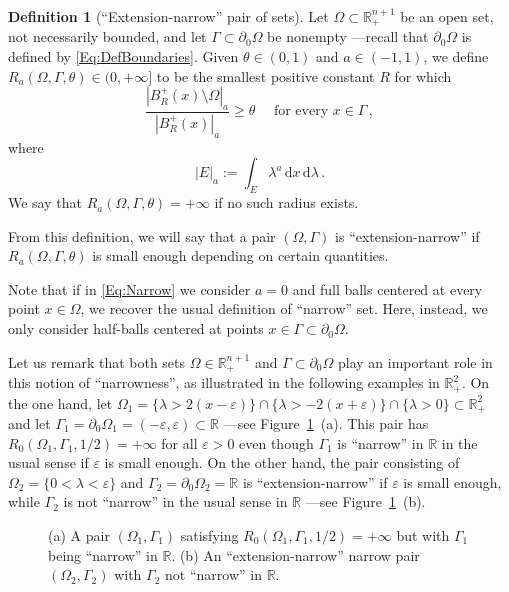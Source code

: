 \documentclass[twoside,leqno,symbols-for-thanks, draft]{rmi}
\numberwithin{equation}{section}
\theoremstyle{definition}
\newtheorem{definition}[theorem]{Definition}
\newcommand{\con}[1]{\mathbb{#1}}
\newcommand{\R}{\con{R}} %
\renewcommand{\d}{\,\mathrm{d}} %
\newcommand{\dx}{\,\mathrm{d}x} %
\begin{document}
\begin{definition}[``Extension-narrow'' pair of sets]
	Let $\Omega \subset \R^{n+1}_+$ be an open set, not necessarily bounded, and let $\Gamma \subset \partial_0 \Omega$ be nonempty ---recall that $\partial_0 \Omega$ is defined by \eqref{Eq:DefBoundaries}. Given $\theta \in (0,1)$ and $a\in (-1,1)$, we define $R_a(\Omega,\Gamma,\theta) \in (0, +\infty]$ to be the smallest positive constant $R$ for which
	\begin{equation}
	\label{Eq:Narrow}
	\dfrac{|B^+_R(x)\setminus \Omega|_a}{|B^+_R(x)|_a} \geq \theta \quad \text{ for every } x \in \Gamma\,,
	\end{equation}
	where 
	$$
	|E|_a := \int_E \lambda^a \dx \d \lambda\,.
	$$
	We say that $R_a(\Omega,\Gamma,\theta) = + \infty$ if no such radius exists.
	
	From this definition, we will say that a pair $(\Omega, \Gamma)$ is ``extension-narrow'' if $R_a(\Omega,\Gamma,\theta)$ is small enough depending on certain quantities.
\end{definition}

Note that if in \eqref{Eq:Narrow} we consider $a=0$ and full balls centered at every point $x\in \Omega$, we recover the usual definition of ``narrow'' set. Here, instead, we only consider half-balls centered at points $x\in \Gamma \subset \partial_0\Omega$.


Let us remark that both sets $\Omega\in \R^{n+1}_+$ and $\Gamma\subset \partial_0\Omega$ play an important role in this notion of ``narrowness'', as illustrated in the following examples in $\R^2_+$. On the one hand, let $ \Omega_1 = \{\lambda>2(x-\varepsilon)\} \cap \{\lambda>-2(x+\varepsilon)\} \cap \{\lambda>0\}\subset \R^2_+ $ and let $\Gamma_1 = \partial_0 \Omega_1 = (-\varepsilon,\varepsilon)\subset \R$ ---see Figure~\ref{Fig:Examples}~(a). This pair has $R_0(\Omega_1,\Gamma_1,1/2) = +\infty$ for all $\varepsilon > 0$ even though $\Gamma_1$ is ``narrow'' in $\R$ in the usual sense if $\varepsilon$ is small enough. On the other hand, the pair consisting of $\Omega_2 = \{0<\lambda<\varepsilon\}$ and $\Gamma_2 = \partial_0 \Omega_2 = \R$ is ``extension-narrow'' if $\varepsilon$ is small enough, while $\Gamma_2$ is not ``narrow'' in the usual sense in $\R$ ---see Figure~\ref{Fig:Examples}~(b). 

\begin{figure}
	
	\caption{(a) A pair $(\Omega_1, \Gamma_1)$ satisfying $R_0(\Omega_1,\Gamma_1,1/2) = +\infty$ but with $\Gamma_1$ being ``narrow'' in $\R$. (b) An ``extension-narrow'' narrow pair $(\Omega_2, \Gamma_2)$ with $\Gamma_2$ not  ``narrow'' in $\R$.}
	\label{Fig:Examples}
\end{figure}
\end{document}
